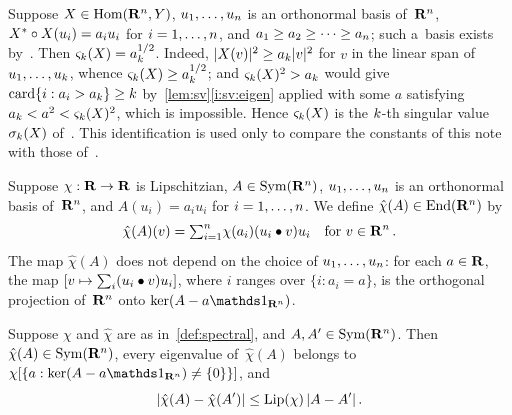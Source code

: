 \documentclass[a4paper,twoside,leqno]{article}
\newcommand{\sv}[1]{\varsigma_{#1}}        %
\begin{document}
\begin{remark}
    \label{rem:sv_singular}
    Suppose $X \in \operatorname{Hom}(\mathbf{R}^{n},Y)$, $u_1, \ldots, u_{n}$ is an orthonormal basis
    of~$\mathbf{R}^{n}$, $X^{*} \circ X(u_i) = a_i u_i$ for $i = 1, \ldots, n$, and $a_1
    \ge a_2 \ge \cdots \ge a_{n}$; such a~basis exists by~\cite[1.7.3]{Federer1969}. Then
    $\sv{\vdim}(X) = a_{\vdim}^{1/2}$. Indeed, $|X(v)|^2 \ge a_{k} |v|^2$ for $v$ in the linear
    span of $u_1, \ldots, u_{k}$, whence $\sv{\vdim}(X) \ge a_{\vdim}^{1/2}$; and
    $\sv{\vdim}(X)^2 > a_{\vdim}$ would give $\operatorname{card} \{ i : a_i > a_{k} \} \ge k$
    by~\ref{lem:sv}\ref{i:sv:eigen} applied with some $a$ satisfying $a_{\vdim} < a^2 <
    \sv{\vdim}(X)^2$, which is impossible. Hence $\sv{\vdim}(X)$ is the $k$-th singular value
    $\sigma_{k}(X)$ of~\cite[Theorem~1.1]{DePhilippisGennaioliPigatiRindler2026}. This
    identification is used only to compare the constants of this note with those
    of~\cite{DePhilippisGennaioliPigatiRindler2026}.
\end{remark}

\begin{definition}
    \label{def:spectral}
    Suppose $\chi : \mathbf{R} \to \mathbf{R}$ is Lipschitzian, $A \in \mathrm{Sym}({\mathbf{R}^{n}})$, $u_1, \ldots,
    u_{n}$ is an orthonormal basis of~$\mathbf{R}^{n}$, and $A(u_i) = a_i u_i$ for $i = 1, \ldots,
    n$. We define $\hat\chi(A) \in \mathrm{End}({\mathbf{R}^{n}})$ by
    \begin{displaymath}
        \hat\chi(A)(v) = {\textstyle\sum_{i=1}^{n}} \chi(a_i) (u_i \bullet v) u_i
        \quad \text{for $v \in \mathbf{R}^{n}$} \,.
    \end{displaymath}
    The map $\hat\chi(A)$ does not depend on the choice of $u_1, \ldots, u_{n}$: for each $a
    \in \mathbf{R}$, the map $[v \mapsto {\textstyle\sum_{i}^{}} (u_i \bullet v) u_i]$, where $i$ ranges over $\{ i :
    a_i = a \}$, is the orthogonal projection of~$\mathbf{R}^{n}$ onto $\ker (A - a \id{\R^{\adim}})$.
\end{definition}

\begin{lemma}
    \label{lem:spectral}
    Suppose $\chi$ and $\hat\chi$ are as in~\ref{def:spectral}, and $A, A' \in
    \mathrm{Sym}({\mathbf{R}^{n}})$. Then $\hat\chi(A) \in \mathrm{Sym}({\mathbf{R}^{n}})$, every eigenvalue
    of~$\hat\chi(A)$ belongs to $\chi[\{ a : \ker(A - a \id{\R^{\adim}}) \ne \{0\} \}]$, and
    \begin{displaymath}
        |\hat\chi(A) - \hat\chi(A')| \le \operatorname{Lip}(\chi) \, |A - A'| \,.
    \end{displaymath}
\end{lemma}
\end{document}
